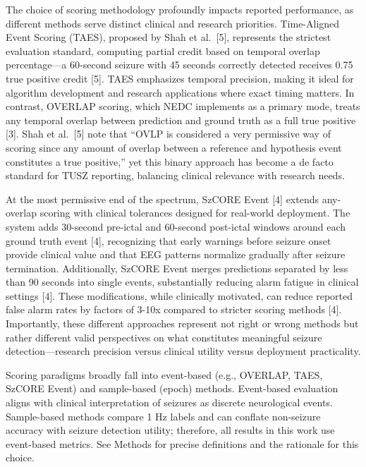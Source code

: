 \documentclass[
]{article}
\begin{document}
The choice of scoring methodology profoundly impacts reported
performance, as different methods serve distinct clinical and research
priorities. Time-Aligned Event Scoring (TAES), proposed by Shah et
al.~{[}5{]}, represents the strictest evaluation standard, computing
partial credit based on temporal overlap percentage---a 60-second
seizure with 45 seconds correctly detected receives 0.75 true positive
credit {[}5{]}. TAES emphasizes temporal precision, making it ideal for
algorithm development and research applications where exact timing
matters. In contrast, OVERLAP scoring, which NEDC implements as a
primary mode, treats any temporal overlap between prediction and ground
truth as a full true positive {[}3{]}. Shah et al.~{[}5{]} note that
``OVLP is considered a very permissive way of scoring since any amount
of overlap between a reference and hypothesis event constitutes a true
positive,'' yet this binary approach has become a de facto standard for
TUSZ reporting, balancing clinical relevance with research needs.

At the most permissive end of the spectrum, SzCORE Event {[}4{]} extends
any-overlap scoring with clinical tolerances designed for real-world
deployment. The system adds 30-second pre-ictal and 60-second post-ictal
windows around each ground truth event {[}4{]}, recognizing that early
warnings before seizure onset provide clinical value and that EEG
patterns normalize gradually after seizure termination. Additionally,
SzCORE Event merges predictions separated by less than 90 seconds into
single events, substantially reducing alarm fatigue in clinical settings
{[}4{]}. These modifications, while clinically motivated, can reduce
reported false alarm rates by factors of 3-10x compared to stricter
scoring methods {[}4{]}. Importantly, these different approaches
represent not right or wrong methods but rather different valid
perspectives on what constitutes meaningful seizure detection---research
precision versus clinical utility versus deployment practicality.

Scoring paradigms broadly fall into event-based (e.g., OVERLAP, TAES,
SzCORE Event) and sample-based (epoch) methods. Event-based evaluation
aligns with clinical interpretation of seizures as discrete neurological
events. Sample-based methods compare 1 Hz labels and can conflate
non-seizure accuracy with seizure detection utility; therefore, all
results in this work use event-based metrics. See Methods for precise
definitions and the rationale for this choice.
\end{document}
